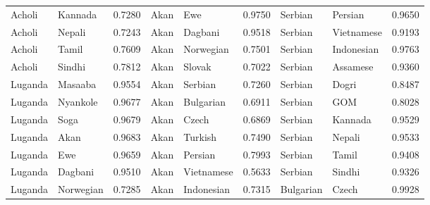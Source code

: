 \documentclass[11pt]{article} %
\begin{document}
\begin{table}
\begin{tabular}{llr@{\hspace{12pt}}llr@{\hspace{12pt}}llr}
            Acholi                       & Kannada             & 0.7280        & Akan                & Ewe                 & 0.9750        & Serbian             & Persian             & 0.9650        \\
            Acholi                       & Nepali              & 0.7243        & Akan                & Dagbani             & 0.9518        & Serbian             & Vietnamese          & 0.9193        \\
            Acholi                       & Tamil               & 0.7609        & Akan                & Norwegian           & 0.7501        & Serbian             & Indonesian          & 0.9763        \\
            Acholi                       & Sindhi              & 0.7812        & Akan                & Slovak              & 0.7022        & Serbian             & Assamese            & 0.9360        \\
            Luganda                      & Masaaba             & 0.9554        & Akan                & Serbian             & 0.7260        & Serbian             & Dogri               & 0.8487        \\
            Luganda                      & Nyankole            & 0.9677        & Akan                & Bulgarian           & 0.6911        & Serbian             & GOM                 & 0.8028        \\
            Luganda                      & Soga                & 0.9679        & Akan                & Czech               & 0.6869        & Serbian             & Kannada             & 0.9529        \\
            Luganda                      & Akan                & 0.9683        & Akan                & Turkish             & 0.7490        & Serbian             & Nepali              & 0.9533        \\
            Luganda                      & Ewe                 & 0.9659        & Akan                & Persian             & 0.7993        & Serbian             & Tamil               & 0.9408        \\
            Luganda                      & Dagbani             & 0.9510        & Akan                & Vietnamese          & 0.5633        & Serbian             & Sindhi              & 0.9326        \\
            Luganda                      & Norwegian           & 0.7285        & Akan                & Indonesian          & 0.7315        & Bulgarian           & Czech               & 0.9928        \\

\end{tabular}
\end{table}
\end{document}

